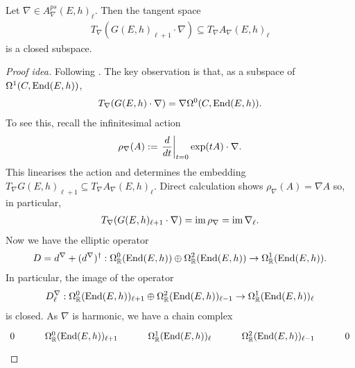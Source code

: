 \documentclass[12pt]{ociamthesis}  %
\begin{document}
\begin{lemma}\label{lem:holomorphic_tangent_is_closed}
  Let $\nabla\in A^{ps}_\nabla(E,h)_{\ell}$. Then the tangent space
  \begin{align*}
    T_\nabla(G(E,h)_{\ell+1}\cdot\nabla) \subseteq T_\nabla A_\nabla(E,h)_\ell
  \end{align*}
  is a closed subspace.
  \begin{proof}[Proof idea]
    Following \cite[77-78]{neitzke2021}.
    The key observation is that, as a subspace of
    $\Omega^1(C,\operatorname{End}(E,h))$,
    \begin{align*}
      T_\nabla (G(E,h)\cdot\nabla) = \nabla\Omega^0(C,\operatorname{End}(E,h)).
    \end{align*}
    To see this, recall the infinitesimal action
    \begin{align*}
      \rho_\nabla(A) := \left.{\frac{d}{dt}}\right\vert_{t=0} \exp(tA)\cdot\nabla.
    \end{align*}
    This linearises the action and determines the embedding
    $T_\nabla G(E,h)_{\ell+1}\subseteq T_\nabla A_\nabla(E,h)_\ell$.
    Direct calculation shows $\rho_\nabla(A) = \nabla A$
    so, in particular,
    \begin{align*}
      T_\nabla(G(E,h)_{\ell+1}\cdot\nabla) = \operatorname{im}\rho_\nabla = \operatorname{im}\nabla_\ell.
    \end{align*}
    Now we have the elliptic operator
    \begin{align*}
      D = d^\nabla + (d^\nabla)^\dagger :
      \Omega^0_{\mathbb R}(\operatorname{End}(E,h)) \oplus
      \Omega^2_{\mathbb R}(\operatorname{End}(E,h)) \to
      \Omega^1_{\mathbb R}(\operatorname{End}(E,h)).
    \end{align*}
    In particular, the image of the operator
    \begin{align*}
      D^\nabla_\ell :
      \Omega^0_{\mathbb R}(\operatorname{End}(E,h))_{\ell+1}
      \oplus \Omega^2_{\mathbb R}(\operatorname{End}(E,h))_{\ell-1}
      \to \Omega^1_{\mathbb R}(\operatorname{End}(E,h))_\ell
    \end{align*}
    is closed. As $\nabla$ is harmonic, we have a chain complex
    \begin{equation*}
      \begin{tikzcd}
        0 & {\Omega^0_{\mathbb R}(\End(E,h))_{\ell+1}} & {\Omega^1_{\mathbb R}(\End(E,h))_\ell} & {\Omega^2_{\mathbb R}(\End(E,h))_{\ell-1}} & 0

\end{tikzcd}
\end{equation*}
\end{proof}
\end{lemma}
\end{document}
